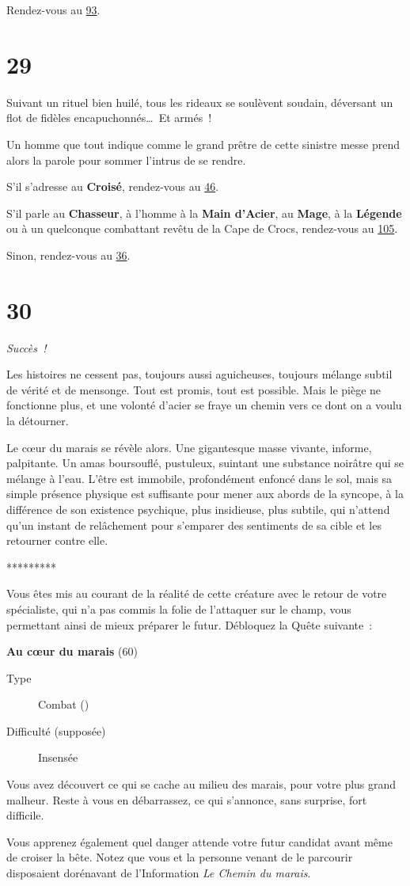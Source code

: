 \documentclass{report}
\newcommand{\gsection}[1]{
    \section{#1}
    \label{section-#1}
}
\newcommand{\glink}[1]{\hyperref[section-#1]{#1}}
\newcommand{\quest}[5]{
    \begin{mdframed}[innertopmargin=0.5cm,innerbottommargin=0.5cm,leftmargin=0.5cm,rightmargin=0.5cm]
        \begin{center}
            \textbf{#1} (#2)
        \end{center}
        \begin{description}
            \item[Type] #3
            \item[Difficulté (supposée)] #4
        \end{description}
        #5
    \end{mdframed}
}
\newcommand{\ellipse}{
    \begin{center}
        *********
    \end{center}
}
\newcommand{\success}{\emph{Succès !}}
\newcommand{\hero}[1]{\textbf{#1}}
\begin{document}
Rendez-vous au \glink{93}.

\gsection{29}

Suivant un rituel bien huilé, tous les rideaux se soulèvent soudain, déversant un flot de fidèles encapuchonnés\dots~Et armés !

Un homme que tout indique comme le grand prêtre de cette sinistre messe prend alors la parole pour sommer l'intrus de se rendre.

S'il s'adresse au \hero{Croisé}, rendez-vous au \glink{46}.

S'il parle au \hero{Chasseur}, à l'homme à la \hero{Main d'Acier}, au \hero{Mage}, à la \hero{Légende} ou à un quelconque  combattant revêtu de la Cape de Crocs, rendez-vous au \glink{105}.

Sinon, rendez-vous au \glink{36}.

\gsection{30}

\success

Les histoires ne cessent pas, toujours aussi aguicheuses, toujours mélange subtil de vérité et de mensonge. Tout est promis, tout est possible. Mais le piège ne fonctionne plus, et une volonté d'acier se fraye un chemin vers ce dont on a voulu la détourner.

Le cœur du marais se révèle alors. Une gigantesque masse vivante, informe, palpitante. Un amas boursouflé, pustuleux, suintant une substance noirâtre qui se mélange à l'eau. L'être est immobile, profondément enfoncé dans le sol, mais sa simple présence physique est suffisante pour mener aux abords de la syncope, à la différence de son existence psychique, plus insidieuse, plus subtile, qui n'attend qu'un instant de relâchement pour s'emparer des sentiments de sa cible et les retourner contre elle.

\ellipse

Vous êtes mis au courant de la réalité de cette créature avec le retour de votre spécialiste, qui n'a pas commis la folie de l'attaquer sur le champ, vous permettant ainsi de mieux préparer le futur. Débloquez la Quête suivante :

\quest{Au cœur du marais}{60}{Combat (\caduceus)}{Insensée}{
Vous avez découvert ce qui se cache au milieu des marais, pour votre plus grand malheur. Reste à vous en débarrassez, ce qui s'annonce, sans surprise, fort difficile.
}

Vous apprenez également quel danger attende votre futur candidat avant même de croiser la bête. Notez que vous et la personne venant de le parcourir disposaient dorénavant de l'Information \emph{Le Chemin du marais}.
\end{document}
